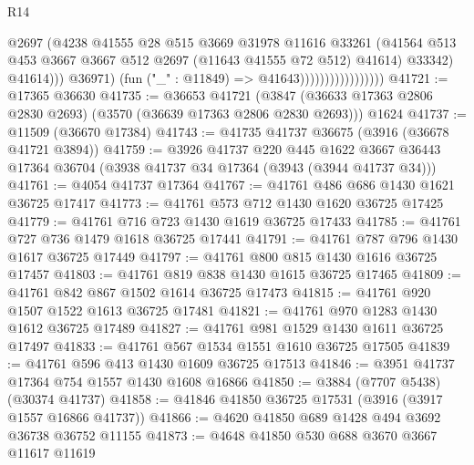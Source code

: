 \begin{lexlean}{R14}
\begin{coremodule}
                                            @2697
                                            (@4238
                                              @41555
                                              @28
                                              @515
                                              @3669
                                              @31978
                                              @11616
                                              @33261
                                              (@41564
                                                @513
                                                @453
                                                @3667
                                                @3667
                                                @512
                                                @2697
                                                (@11643 @41555 @72 @512)
                                                @41614)
                                              @33342)
                                            @41614)))
                                      @36971)
                                    (fun ("_" : @11849) => @41643)))))))))))))))))
@41721 := @17365 @36630
@41735 := @36653
    @41721
    (@3847 (@36633 @17363 @2806 @2830 @2693) (@3570 (@36639 @17363 @2806 @2830 @2693)))
    @1624
@41737 := @11509 (@36670 @17384)
@41743 := @41735 @41737 @36675 (@3916 (@36678 @41721 @3894))
@41759 := @3926
    @41737
    @220
    @445
    @1622
    @3667
    @36443
    @17364
    @36704
    (@3938 @41737 @34 @17364 (@3943 (@3944 @41737 @34)))
@41761 := @4054 @41737 @17364
@41767 := @41761 @486 @686 @1430 @1621 @36725 @17417
@41773 := @41761 @573 @712 @1430 @1620 @36725 @17425
@41779 := @41761 @716 @723 @1430 @1619 @36725 @17433
@41785 := @41761 @727 @736 @1479 @1618 @36725 @17441
@41791 := @41761 @787 @796 @1430 @1617 @36725 @17449
@41797 := @41761 @800 @815 @1430 @1616 @36725 @17457
@41803 := @41761 @819 @838 @1430 @1615 @36725 @17465
@41809 := @41761 @842 @867 @1502 @1614 @36725 @17473
@41815 := @41761 @920 @1507 @1522 @1613 @36725 @17481
@41821 := @41761 @970 @1283 @1430 @1612 @36725 @17489
@41827 := @41761 @981 @1529 @1430 @1611 @36725 @17497
@41833 := @41761 @567 @1534 @1551 @1610 @36725 @17505
@41839 := @41761 @596 @413 @1430 @1609 @36725 @17513
@41846 := @3951 @41737 @17364 @754 @1557 @1430 @1608 @16866
@41850 := @3884 (@7707 @5438) (@30374 @41737)
@41858 := @41846 @41850 @36725 @17531 (@3916 (@3917 @1557 @16866 @41737))
@41866 := @4620 @41850 @689 @1428 @494 @3692 @36738 @36752 @11155
@41873 := @4648 @41850 @530 @688 @3670 @3667 @11617 @11619

\end{coremodule}
\end{lexlean}
